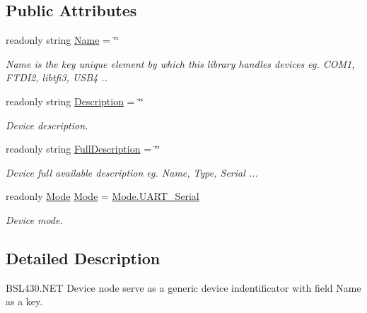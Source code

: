 \subsection*{Public Attributes}
\begin{DoxyCompactItemize}
\item 
readonly string \mbox{\hyperlink{class_b_s_l430___n_e_t_1_1_bsl430_net_device_aca2c9b709a7da017f45b5de85aa4f0fa}{Name}} = \char`\"{}\char`\"{}
\begin{DoxyCompactList}\small\item\em Name is the key unique element by which this library handles devices eg. C\+O\+M1, F\+T\+D\+I2, libtfi3, U\+S\+B4 .. \end{DoxyCompactList}\item 
readonly string \mbox{\hyperlink{class_b_s_l430___n_e_t_1_1_bsl430_net_device_a9484d2670f3328159a0b250d82995bc5}{Description}} = \char`\"{}\char`\"{}
\begin{DoxyCompactList}\small\item\em Device description. \end{DoxyCompactList}\item 
readonly string \mbox{\hyperlink{class_b_s_l430___n_e_t_1_1_bsl430_net_device_a2f438fa3df9b8df7e7d9a68fd1129f09}{Full\+Description}} = \char`\"{}\char`\"{}
\begin{DoxyCompactList}\small\item\em Device full available description eg. Name, Type, Serial ... \end{DoxyCompactList}\item 
readonly \mbox{\hyperlink{namespace_b_s_l430___n_e_t_aa1c6981cb6f279b5491d861ca555a1d7}{Mode}} \mbox{\hyperlink{class_b_s_l430___n_e_t_1_1_bsl430_net_device_a4efd86d2dbdb52db51e759a2c0ca9c30}{Mode}} = \mbox{\hyperlink{namespace_b_s_l430___n_e_t_aa1c6981cb6f279b5491d861ca555a1d7a766287f492a16ccdf7b4b2a8a5ba125b}{Mode.\+U\+A\+R\+T\+\_\+\+Serial}}
\begin{DoxyCompactList}\small\item\em Device mode. \end{DoxyCompactList}\end{DoxyCompactItemize}


\subsection{Detailed Description}
B\+S\+L430.\+N\+ET Device node serve as a generic device indentificator with field \textquotesingle{}Name\textquotesingle{} as a key. 



